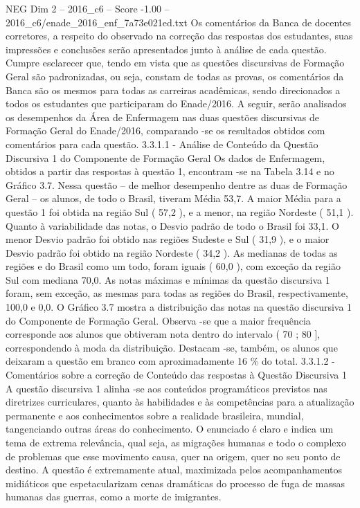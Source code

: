 \begin{textsample}{NEG Dim 2 – 2016\_c6 – Score -1.00 – 2016\_c6/enade\_2016\_enf\_7a73e021ed.txt}
Os comentários da Banca de docentes corretores, a respeito do observado na correção das respostas dos estudantes, suas impressões e conclusões serão apresentados junto à análise de cada questão.
Cumpre esclarecer que, tendo em vista que as questões discursivas de Formação Geral são padronizadas, ou seja, constam de todas as provas, os comentários da Banca são os mesmos para todas as carreiras acadêmicas, sendo direcionados a todos os estudantes que participaram do Enade/2016.
A seguir, serão analisados os desempenhos da Área de Enfermagem nas duas questões discursivas de Formação Geral do Enade/2016, comparando -se os resultados obtidos com comentários para cada questão. 3.3.1.1 - Análise de Conteúdo da Questão Discursiva 1 do Componente de Formação Geral Os dados de Enfermagem, obtidos a partir das respostas à questão 1, encontram -se na Tabela 3.14 e no Gráfico 3.7.
Nessa questão – de melhor desempenho dentre as duas de Formação Geral – os alunos, de todo o Brasil, tiveram Média 53,7.
A maior Média para a questão 1 foi obtida na região Sul ( 57,2 ), e a menor, na região Nordeste ( 51,1 ).
Quanto à variabilidade das notas, o Desvio padrão de todo o Brasil foi 33,1.
O menor Desvio padrão foi obtido nas regiões Sudeste e Sul ( 31,9 ), e o maior Desvio padrão foi obtido na região Nordeste ( 34,2 ).
As medianas de todas as regiões e do Brasil como um todo, foram iguais ( 60,0 ), com exceção da região Sul com mediana 70,0.
As notas máximas e mínimas da questão discursiva 1 foram, sem exceção, as mesmas para todas as regiões do Brasil, respectivamente, 100,0 e 0,0.
O Gráfico 3.7 mostra a distribuição das notas na questão discursiva 1 do Componente de Formação Geral.
Observa -se que a maior frequência corresponde aos alunos que obtiveram nota dentro do intervalo ( 70 ; 80 ], correspondendo à moda da distribuição.
Destacam -se, também, os alunos que deixaram a questão em branco com aproximadamente 16 \% do total. 3.3.1.2 - Comentários sobre a correção de Conteúdo das respostas à Questão Discursiva 1 A questão discursiva 1 alinha -se aos conteúdos programáticos previstos nas diretrizes curriculares, quanto às habilidades e às competências para a atualização permanente e aos conhecimentos sobre a realidade brasileira, mundial, tangenciando outras áreas do conhecimento.
O enunciado é claro e indica um tema de extrema relevância, qual seja, as migrações humanas e todo o complexo de problemas que esse movimento causa, quer na origem, quer no seu ponto de destino.
A questão é extremamente atual, maximizada pelos acompanhamentos midiáticos que espetacularizam cenas dramáticas do processo de fuga de massas humanas das guerras, como a morte de imigrantes.

\end{textsample}
